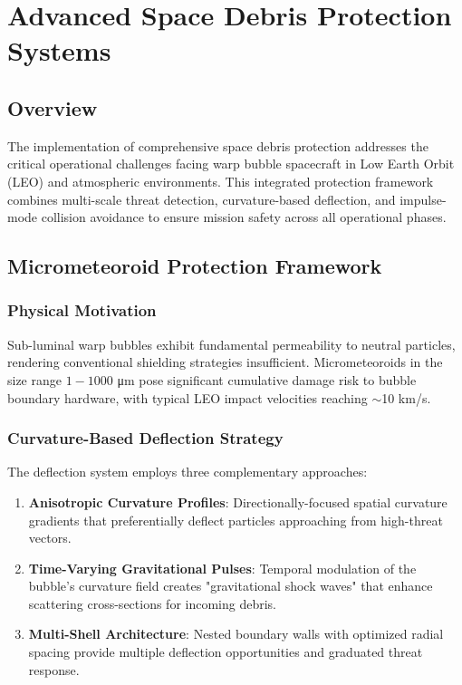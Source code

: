 \section{Advanced Space Debris Protection Systems}
\label{sec:space_debris_protection}

\subsection{Overview}

The implementation of comprehensive space debris protection addresses the critical operational challenges facing warp bubble spacecraft in Low Earth Orbit (LEO) and atmospheric environments. This integrated protection framework combines multi-scale threat detection, curvature-based deflection, and impulse-mode collision avoidance to ensure mission safety across all operational phases.

\subsection{Micrometeoroid Protection Framework}

\subsubsection{Physical Motivation}
Sub-luminal warp bubbles exhibit fundamental permeability to neutral particles, rendering conventional shielding strategies insufficient. Micrometeoroids in the size range $1-1000$ μm pose significant cumulative damage risk to bubble boundary hardware, with typical LEO impact velocities reaching $\sim$10 km/s.

\subsubsection{Curvature-Based Deflection Strategy}
The deflection system employs three complementary approaches:

\begin{enumerate}
\item \textbf{Anisotropic Curvature Profiles}: Directionally-focused spatial curvature gradients that preferentially deflect particles approaching from high-threat vectors.

\item \textbf{Time-Varying Gravitational Pulses}: Temporal modulation of the bubble's curvature field creates "gravitational shock waves" that enhance scattering cross-sections for incoming debris.

\item \textbf{Multi-Shell Architecture}: Nested boundary walls with optimized radial spacing provide multiple deflection opportunities and graduated threat response.
\end{enumerate}

